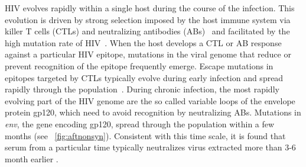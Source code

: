 \documentclass[rmp, twocolumn]{revtex4}
\newcommand{\env}{\textit{env}}
\begin{document}
HIV evolves rapidly within a single host during the course of the infection.
This evolution is driven by strong selection imposed by the host immune system
via killer T cells (CTLs) and neutralizing antibodies
(ABs)~\citep{rambaut_causes_2004} and facilitated by the high
mutation rate of HIV~\citep{mansky_lower_1995,abram_nature_2010}. When the host
develops a CTL or AB response against a particular HIV epitope, mutations in the viral genome that
reduce or prevent recognition of the epitope frequently emerge. Escape mutations
in epitopes targeted by CTLs typically evolve during early infection and spread
rapidly through the population~\citep{mcmichael_immune_2009}. During chronic
infection, the most rapidly evolving part of the HIV genome are the so called
variable loops of the envelope protein gp120, which need to avoid recognition by
neutralizing ABs.  Mutations in \env, the gene encoding gp120, spread
through the population within a few months (see \figurename~\ref{fig:aftnonsyn}).
Consistent with this time scale, it is found that serum from a
particular time typically neutralizes virus extracted more than 3-6 month
earlier \citep{richman_rapid_2003}.
\end{document}
